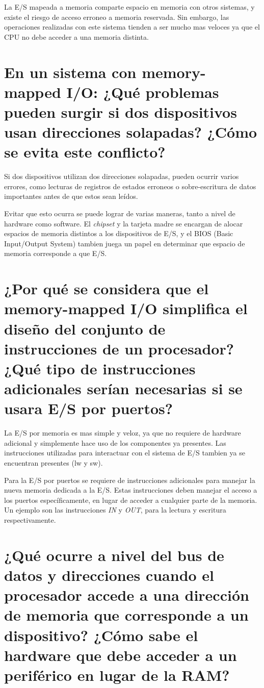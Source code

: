 \documentclass[titlepage]{article}
\begin{document}
La E/S mapeada a memoria comparte espacio en memoria con otros sistemas, y existe el riesgo de acceso erroneo a memoria reservada. Sin embargo, las operaciones realizadas con este sistema tienden a ser mucho mas veloces ya que el CPU no debe acceder a una memoria distinta.

\section*{En un sistema con memory-mapped I/O: ¿Qué problemas pueden surgir si dos dispositivos usan direcciones solapadas? ¿Cómo se evita este conflicto?}

Si dos dispositivos utilizan dos direcciones solapadas, pueden ocurrir varios errores, como lecturas de registros de estados erroneos o sobre-escritura de datos importantes antes de que estos sean leídos.

Evitar que esto ocurra se puede lograr de varias maneras, tanto a nivel de hardware como software. El \emph{chipset} y la tarjeta madre se encargan de alocar espacios de memoria distintos a los dispositivos de E/S, y el BIOS (Basic Input/Output System) tambien juega un papel en determinar que espacio de memoria corresponde a que E/S.

\section*{¿Por qué se considera que el memory-mapped I/O simplifica el diseño del conjunto de instrucciones de un procesador? ¿Qué tipo de instrucciones adicionales serían necesarias si se usara E/S por puertos?}

La E/S por memoria es mas simple y veloz, ya que no requiere de hardware adicional y simplemente hace uso de los componentes ya presentes. Las instrucciones utilizadas para interactuar con el sistema de E/S tambien ya se encuentran presentes (lw y sw).

Para la E/S por puertos se requiere de instrucciones adicionales para manejar la nueva memoria dedicada a la E/S. Estas instrucciones deben manejar el acceso a los puertos específicamente, en lugar de acceder a cualquier parte de la memoria. Un ejemplo son las instrucciones \emph{IN} y \emph{OUT}, para la lectura y escritura respectivamente.

\section*{¿Qué ocurre a nivel del bus de datos y direcciones cuando el procesador accede a una dirección de memoria que corresponde a un dispositivo? ¿Cómo sabe el hardware que debe acceder a un periférico en lugar de la RAM?}
\end{document}
